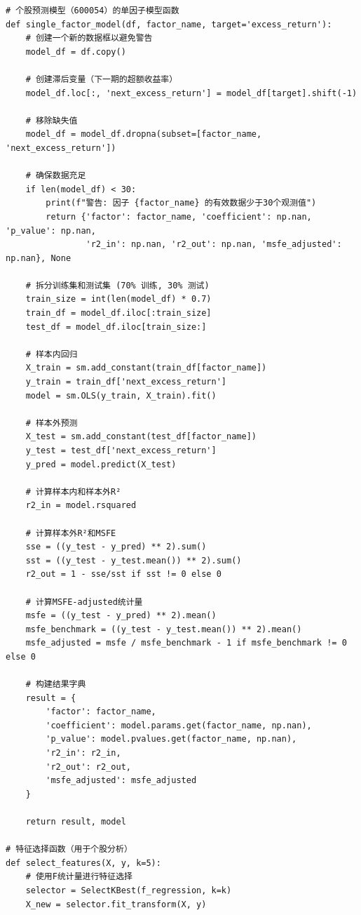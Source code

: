 \documentclass[12pt, a4paper]{article}
\begin{document}
\begin{lstlisting}[basicstyle=\small\ttfamily, breaklines=true, columns=fullflexible]
# 个股预测模型（600054）的单因子模型函数
def single_factor_model(df, factor_name, target='excess_return'):
    # 创建一个新的数据框以避免警告
    model_df = df.copy()
    
    # 创建滞后变量（下一期的超额收益率）
    model_df.loc[:, 'next_excess_return'] = model_df[target].shift(-1)
    
    # 移除缺失值
    model_df = model_df.dropna(subset=[factor_name, 'next_excess_return'])
    
    # 确保数据充足
    if len(model_df) < 30:
        print(f"警告: 因子 {factor_name} 的有效数据少于30个观测值")
        return {'factor': factor_name, 'coefficient': np.nan, 'p_value': np.nan, 
                'r2_in': np.nan, 'r2_out': np.nan, 'msfe_adjusted': np.nan}, None
    
    # 拆分训练集和测试集 (70% 训练, 30% 测试)
    train_size = int(len(model_df) * 0.7)
    train_df = model_df.iloc[:train_size]
    test_df = model_df.iloc[train_size:]
    
    # 样本内回归
    X_train = sm.add_constant(train_df[factor_name])
    y_train = train_df['next_excess_return']
    model = sm.OLS(y_train, X_train).fit()
    
    # 样本外预测
    X_test = sm.add_constant(test_df[factor_name])
    y_test = test_df['next_excess_return']
    y_pred = model.predict(X_test)
    
    # 计算样本内和样本外R²
    r2_in = model.rsquared
    
    # 计算样本外R²和MSFE
    sse = ((y_test - y_pred) ** 2).sum()
    sst = ((y_test - y_test.mean()) ** 2).sum()
    r2_out = 1 - sse/sst if sst != 0 else 0
    
    # 计算MSFE-adjusted统计量
    msfe = ((y_test - y_pred) ** 2).mean()
    msfe_benchmark = ((y_test - y_test.mean()) ** 2).mean()
    msfe_adjusted = msfe / msfe_benchmark - 1 if msfe_benchmark != 0 else 0
    
    # 构建结果字典
    result = {
        'factor': factor_name,
        'coefficient': model.params.get(factor_name, np.nan),
        'p_value': model.pvalues.get(factor_name, np.nan),
        'r2_in': r2_in,
        'r2_out': r2_out,
        'msfe_adjusted': msfe_adjusted
    }
    
    return result, model

# 特征选择函数（用于个股分析）
def select_features(X, y, k=5):
    # 使用F统计量进行特征选择
    selector = SelectKBest(f_regression, k=k)
    X_new = selector.fit_transform(X, y)
    

\end{lstlisting}
\end{document}
